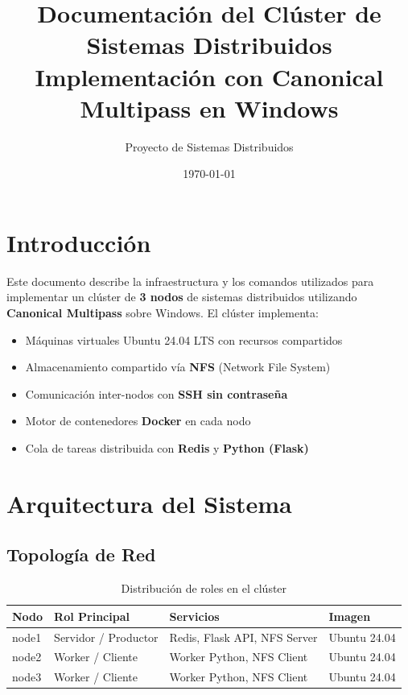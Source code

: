 \documentclass[12pt,a4paper]{article}
\title{
    \vspace{-1cm}
    {\LARGE \textbf{Documentación del Clúster de Sistemas Distribuidos}} \\[0.5em]
    {\large Implementación con Canonical Multipass en Windows}
}
\author{Proyecto de Sistemas Distribuidos}
\date{\today}
\begin{document}
\maketitle
\tableofcontents
\newpage

\section{Introducción}

Este documento describe la infraestructura y los comandos utilizados para implementar un clúster de \textbf{3 nodos} de sistemas distribuidos utilizando \textbf{Canonical Multipass} sobre Windows. El clúster implementa:

\begin{itemize}
    \item Máquinas virtuales Ubuntu 24.04 LTS con recursos compartidos
    \item Almacenamiento compartido vía \textbf{NFS} (Network File System)
    \item Comunicación inter-nodos con \textbf{SSH sin contraseña}
    \item Motor de contenedores \textbf{Docker} en cada nodo
    \item Cola de tareas distribuida con \textbf{Redis} y \textbf{Python (Flask)}
\end{itemize}

\section{Arquitectura del Sistema}

\subsection{Topología de Red}

\begin{table}[H]
\centering
\begin{tabular}{@{}llll@{}}
\toprule
\textbf{Nodo} & \textbf{Rol Principal} & \textbf{Servicios} & \textbf{Imagen} \\
\midrule
node1 & Servidor / Productor & Redis, Flask API, NFS Server & Ubuntu 24.04 \\
node2 & Worker / Cliente & Worker Python, NFS Client & Ubuntu 24.04 \\
node3 & Worker / Cliente & Worker Python, NFS Client & Ubuntu 24.04 \\
\bottomrule
\end{tabular}
\caption{Distribución de roles en el clúster}
\end{table}
\end{document}
